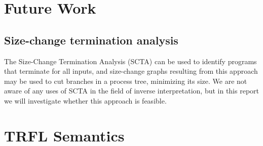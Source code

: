 \documentclass[10pt]{../sigplanconf}
\begin{document}
\section{Future Work}
\subsection{Size-change termination analysis}
  The Size-Change Termination Analysis (SCTA)\cite{lee2001size} can be
  used to identify programs that terminate for all inputs, and
  size-change graphs resulting from this approach may be used to cut
  branches in a process tree, minimizing its size. We are not aware of
  any uses of SCTA in the field of inverse interpretation, but in this
  report we will investigate whether this approach is feasible.







\appendix
\section{TRFL Semantics}
\label{sec:semantics}
\end{document}
